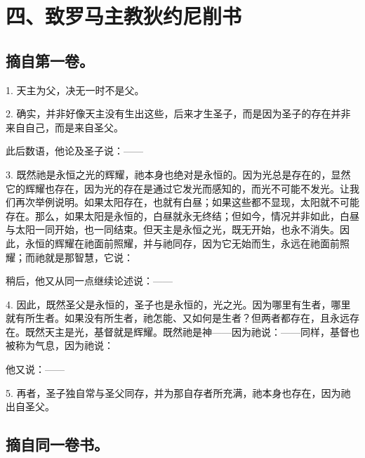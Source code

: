 
\section{四、致罗马主教狄约尼削书}


\subsection{摘自第一卷。}

1. 天主为父，决无一时不是父。\par

2. 确实，并非好像天主没有生出这些，后来才生圣子，而是因为圣子的存在并非来自自己，而是来自圣父。\par

此后数语，他论及圣子说：——\par

3. 既然祂是永恒之光的辉耀，祂本身也绝对是永恒的。因为光总是存在的，显然它的辉耀也存在，因为光的存在是通过它发光而感知的，而光不可能不发光。让我们再次举例说明。如果太阳存在，也就有白昼；如果这些都不显现，太阳就不可能存在。那么，如果太阳是永恒的，白昼就永无终结；但如今，情况并非如此，白昼与太阳一同开始，也一同结束。但天主是永恒之光，既无开始，也永不消失。因此，永恒的辉耀在祂面前照耀，并与祂同存，因为它无始而生，永远在祂面前照耀；而祂就是那智慧，它说：\par

稍后，他又从同一点继续论述说：——\par

4. 因此，既然圣父是永恒的，圣子也是永恒的，光之光。因为哪里有生者，哪里就有所生者。如果没有所生者，祂怎能、又如何是生者？但两者都存在，且永远存在。既然天主是光，基督就是辉耀。既然祂是神——因为祂说：——同样，基督也被称为气息，因为祂说：\par

他又说：——\par

5. 再者，圣子独自常与圣父同存，并为那自存者所充满，祂本身也存在，因为祂出自圣父。\par


\subsection{摘自同一卷书。}

